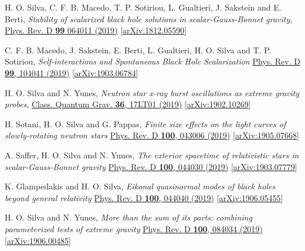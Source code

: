 \documentclass[10pt]{article}
\begin{document}
\begin{bibenum}
    \item H. O. Silva, C. F. B. Macedo, T. P. Sotiriou, L. Gualtieri,
    	  J. Sakstein and E. Berti,
	\emph{Stability of scalarized black hole solutions in scalar-Gauss-Bonnet gravity},
	\href{https://journals.aps.org/prd/abstract/10.1103/PhysRevD.99.064011}{Phys. Rev. D {\bf99} 064011 (2019)}
	[\href{https://arxiv.org/abs/1812.05590}{arXiv:1812.05590}]

    \item C. F. B. Macedo, J. Sakstein, E. Berti, L. Gualtieri, H. O. Silva and T. P. Sotiriou,
    \emph{Self-interactions and Spontaneous Black Hole Scalarization}
    \href{https://journals.aps.org/prd/abstract/10.1103/PhysRevD.99.104041}{Phys. Rev. D {\bf 99}, 104041 (2019)}
    [\href{https://arxiv.org/abs/1903.06784}{arXiv:1903.06784}]

    \item H. O. Silva and N. Yunes,
    \emph{Neutron star x-ray burst oscillations as extreme gravity probes},
    \href{https://iopscience.iop.org/article/10.1088/1361-6382/ab3560}{Class. Quantum Grav. {\bf 36}, 17LT01 (2019)}
    [\href{https://arxiv.org/abs/1902.10269}{arXiv:1902.10269}]

    \item H. Sotani, H. O. Silva and G. Pappas,
    \emph{Finite size effects on the light curves of slowly-rotating neutron stars}
    \href{https://journals.aps.org/prd/abstract/10.1103/PhysRevD.100.043006}{Phys. Rev. D {\bf 100}, 043006 (2019)}
    [\href{https://arxiv.org/abs/1905.07668}{arXiv:1905.07668}]
    \label{itm:pp_fs}

    \item A. Saffer, H. O. Silva and N. Yunes,
    \emph{The exterior spacetime of relativistic stars in scalar-Gauss-Bonnet gravity}
    \href{https://journals.aps.org/prd/abstract/10.1103/PhysRevD.100.044030}{Phys. Rev. D {\bf 100}, 044030 (2019)}
    [\href{https://arxiv.org/abs/1903.07779}{arXiv:1903.07779}]

    \item K. Glampedakis and H. O. Silva,
    \emph{Eikonal quasinormal modes of black holes beyond general relativity}
    \href{https://journals.aps.org/prd/abstract/10.1103/PhysRevD.100.044040}{Phys. Rev. D {\bf 100}, 044040 (2019)}
    [\href{https://arxiv.org/abs/1906.05455}{arXiv:1906.05455}]

    \item H. O. Silva and N. Yunes,
    \emph{More than the sum of its parts: combining parameterized tests of extreme gravity}
    \href{https://link.aps.org/doi/10.1103/PhysRevD.100.084034}{Phys. Rev. D {\bf 100}, 084034 (2019)}
    [\href{https://arxiv.org/abs/1906.00485}{arXiv:1906.00485}]


\end{bibenum}
\end{document}
